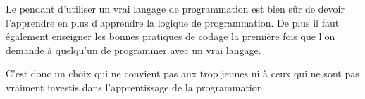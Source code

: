 Le pendant d'utiliser un vrai langage de programmation est bien sûr de devoir l'apprendre en plus d'apprendre la logique de programmation. De plus il faut également enseigner les bonnes pratiques de codage la première fois que l'on demande à quelqu'un de programmer avec un vrai langage. 

C'est donc un choix qui ne convient pas aux trop jeunes ni à ceux qui ne sont pas vraiment investis dans l'apprentissage de la programmation.
